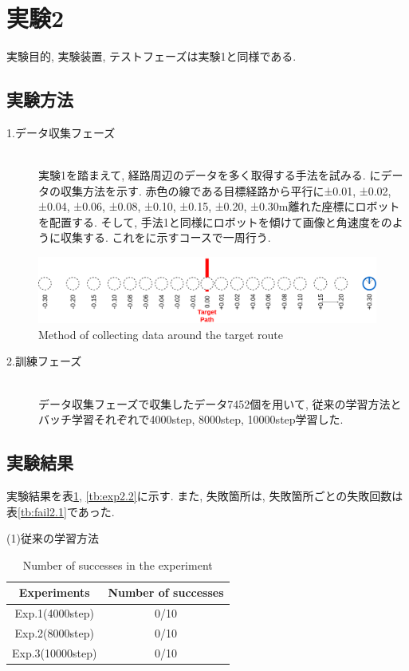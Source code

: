 \newpage
\section{実験2}
実験目的, 実験装置, テストフェーズは実験1と同様である.
\subsection{実験方法}
\begin{description}
  \item[1.データ収集フェーズ]\mbox{}\\実験1を踏まえて, 経路周辺のデータを多く取得する手法を試みる. にデータの収集方法を示す. 赤色の線である目標経路から平行に±0.01, ±0.02, ±0.04, ±0.06, ±0.08, ±0.10, ±0.15, ±0.20, ±0.30m離れた座標にロボットを配置する. そして, 手法1と同様にロボットを傾けて画像と角速度をのように収集する. これをに示すコースで一周行う.  
\end{description}

\begin{figure}[h]
  \centering
  \includegraphics[keepaspectratio, scale=0.18]{images/collect-data.png}
  \caption{Method of collecting data around the target route}
  \label{Fig:collect-data}
  \end{figure}

\begin{description}
  \item[2.訓練フェーズ]\mbox{}\\データ収集フェーズで収集したデータ7452個を用いて, 従来の学習方法とバッチ学習それぞれで4000step, 8000step, 10000step学習した. 
\end{description}

\subsection{実験結果}
実験結果を表\ref{tb:exp2.1}, \ref{tb:exp2.2}に示す. また, 失敗箇所は, 失敗箇所ごとの失敗回数は表\ref{tb:fail2.1}であった. 

\newpage
\begin{description}
  \item [(1)従来の学習方法]
\end{description}
\begin{table}[h]
  \centering
  \begin{tabular}{|c|c|} \hline
    Experiments & Number of successes \\ \hline
    Exp.1(4000step) & 0/10 \\ \hline
    Exp.2(8000step) & 0/10 \\ \hline
    Exp.3(10000step) & 0/10 \\ \hline
  \end{tabular}
  \caption{Number of successes in the experiment}
  \label{tb:exp2.1}
\end{table}

